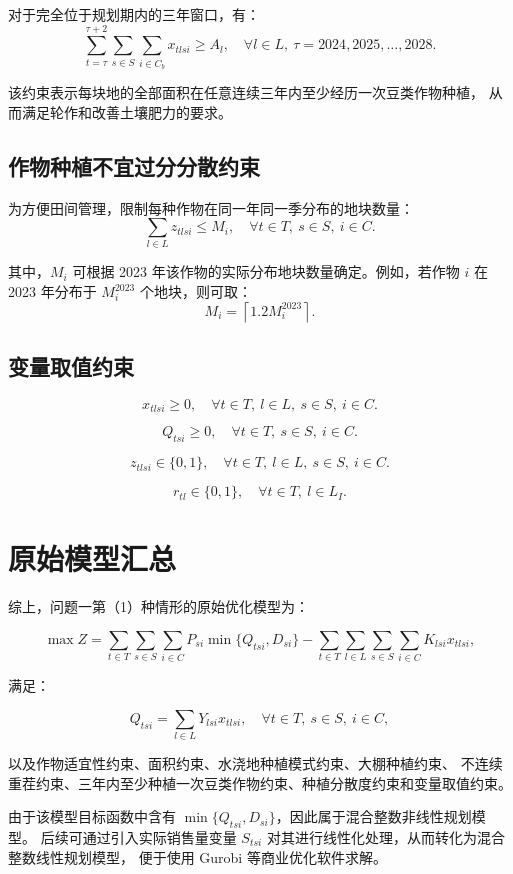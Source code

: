\documentclass[12pt,a4paper]{ctexart}
\begin{document}
对于完全位于规划期内的三年窗口，有：
\[
\sum_{t=\tau}^{\tau+2}
\sum_{s\in S}
\sum_{i\in C_b}
x_{tlsi}
\geq A_l,
\quad \forall l\in L,\ \tau=2024,2025,\ldots,2028.
\]

该约束表示每块地的全部面积在任意连续三年内至少经历一次豆类作物种植，
从而满足轮作和改善土壤肥力的要求。

\subsection{作物种植不宜过分分散约束}

为方便田间管理，限制每种作物在同一年同一季分布的地块数量：
\[
\sum_{l\in L}z_{tlsi}\leq M_i,
\quad \forall t\in T,\ s\in S,\ i\in C.
\]

其中，$M_i$ 可根据 2023 年该作物的实际分布地块数量确定。例如，若作物 $i$ 在 2023 年分布于
$M_i^{2023}$ 个地块，则可取：
\[
M_i=\left\lceil 1.2M_i^{2023}\right\rceil.
\]

\subsection{变量取值约束}

\[
x_{tlsi}\geq 0,
\quad \forall t\in T,\ l\in L,\ s\in S,\ i\in C.
\]

\[
Q_{tsi}\geq 0,
\quad \forall t\in T,\ s\in S,\ i\in C.
\]

\[
z_{tlsi}\in\{0,1\},
\quad \forall t\in T,\ l\in L,\ s\in S,\ i\in C.
\]

\[
r_{tl}\in\{0,1\},
\quad \forall t\in T,\ l\in L_I.
\]

\section{原始模型汇总}

综上，问题一第（1）种情形的原始优化模型为：

\[
\max Z=
\sum_{t\in T}\sum_{s\in S}\sum_{i\in C}
P_{si}\min\{Q_{tsi},D_{si}\}
-
\sum_{t\in T}\sum_{l\in L}\sum_{s\in S}\sum_{i\in C}
K_{lsi}x_{tlsi},
\]

满足：

\[
Q_{tsi}=\sum_{l\in L}Y_{lsi}x_{tlsi},
\quad \forall t\in T,\ s\in S,\ i\in C,
\]

以及作物适宜性约束、面积约束、水浇地种植模式约束、大棚种植约束、
不连续重茬约束、三年内至少种植一次豆类作物约束、种植分散度约束和变量取值约束。

由于该模型目标函数中含有 $\min\{Q_{tsi},D_{si}\}$，因此属于混合整数非线性规划模型。
后续可通过引入实际销售量变量 $S_{tsi}$ 对其进行线性化处理，从而转化为混合整数线性规划模型，
便于使用 Gurobi 等商业优化软件求解。
\end{document}
